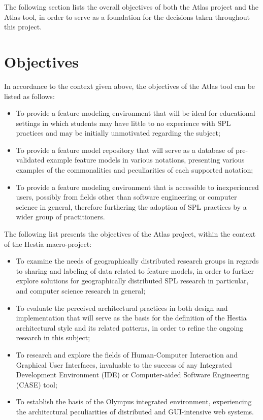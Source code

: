 The following section lists the overall objectives of both the Atlas project and the Atlas tool, in order to serve as a foundation for the decisions taken throughout this project.


\section{Objectives}

In accordance to the context given above, the objectives of the Atlas tool can be listed as follows:

\begin{itemize}
    \item To provide a feature modeling environment that will be ideal for educational settings in which students may have little to no experience with SPL practices and may be initially unmotivated regarding the subject;
    \item To provide a feature model repository that will serve as a database of pre-validated example feature models in various notations, presenting various examples of the commonalities and peculiarities of each supported notation;
    \item To provide a feature modeling environment that is accessible to inexperienced users, possibly from fields other than software engineering or computer science in general, therefore furthering the adoption of SPL practices by a wider group of practitioners.
\end{itemize}

The following list presents the objectives of the Atlas project, within the context of the Hestia macro-project:

\begin{itemize}
    \item To examine the needs of geographically distributed research groups in regards to sharing and labeling of data related to feature models, in order to further explore solutions for geographically distributed SPL research in particular, and computer science research in general;
    \item To evaluate the perceived architectural practices in both design and implementation that will serve as the basis for the definition of the Hestia architectural style and its related patterns, in order to refine the ongoing research in this subject;
    \item To research and explore the fields of Human-Computer Interaction and Graphical User Interfaces, invaluable to the success of any Integrated Development Environment (IDE) or Computer-aided Software Engineering (CASE) tool;
    \item To establish the basis of the Olympus integrated environment, experiencing the architectural peculiarities of distributed and GUI-intensive web systems.
\end{itemize}